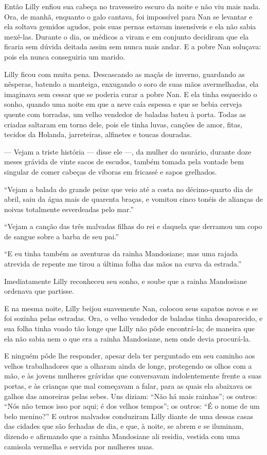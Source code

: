 Então Lilly enfiou sua cabeça no travesseiro escuro da noite e não viu
mais nada. Ora, de manhã, enquanto o galo cantava, foi impossível para Nan
se levantar e ela soltava gemidos agudos, pois suas pernas estavam
insensíveis e ela não sabia mexê-las. Durante o dia, os médicos a viram e
em conjunto decidiram que ela ficaria sem dúvida deitada assim sem nunca
mais andar. E a pobre Nan soluçava: pois ela nunca conseguiria um marido.

Lilly ficou com muita pena. Descascando as maçãs de inverno, guardando
as nêsperas, batendo a manteiga, enxugando o soro de suas mãos
avermelhadas, ela imaginava sem cessar que se poderia curar a pobre Nan. E
ela tinha esquecido o sonho, quando uma noite em que a neve caía espessa e
que se bebia cerveja quente com torradas, um velho vendedor de baladas
bateu à porta. Todas as criadas saltaram em torno dele, pois ele tinha
luvas, canções de amor, fitas, tecidos da Holanda, jarreteiras, alfinetes
e toucas douradas.

--- Vejam a triste história --- disse ele ---, da mulher do usurário, durante
doze meses grávida de vinte sacos de escudos, também tomada pela vontade
bem \mbox{singular} de comer cabeças de víboras em fricassé e sapos grelhados.

“Vejam a balada do grande peixe que veio até a costa no décimo-quarto
dia de abril, saiu da água mais de quarenta braças, e vomitou cinco tonéis
de alianças de noivas totalmente esverdeadas pelo mar.”

“Vejam a canção das três malvadas filhas do rei e daquela que derramou
um copo de sangue sobre a barba de seu pai.”

“E eu tinha também as aventuras da rainha Mandosiane; mas uma rajada atrevida
de repente me tirou a última folha das mãos na curva da estrada.”

Imediatamente Lilly reconheceu seu sonho, e soube que a rainha
Mandosiane ordenava que partisse.

E na mesma noite, Lilly beijou suavemente Nan, colocou seus sapatos
novos e se foi sozinha pelas estradas. Ora, o velho vendedor de baladas
tinha desaparecido, e sua folha tinha voado tão longe que Lilly não pôde
encontrá-la; de maneira que ela não sabia nem o que era a rainha
Mandosiane, nem onde devia procurá-la.

E ninguém pôde lhe responder, apesar dela ter perguntado em seu caminho
aos velhos trabalhadores que a olharam ainda de longe, protegendo os olhos
com a mão, e às jovens mulheres grávidas que conversavam indolentemente
frente a suas portas, e às crianças que mal começavam a falar, para as
quais ela abaixava os galhos das amoreiras pelas sebes. Uns diziam: “Não
há mais rainhas”; os outros: “Nós não temos isso por aqui; é dos velhos
tempos”; os outros: “É o nome de um belo menino?” E outros malvados
conduziram Lilly diante de uma dessas casas das cidades que são fechadas
de dia, e que, à noite, se abrem e se iluminam, dizendo e afirmando que a
rainha Mandosiane ali residia, vestida com uma camisola vermelha e servida
por mulheres nuas.

